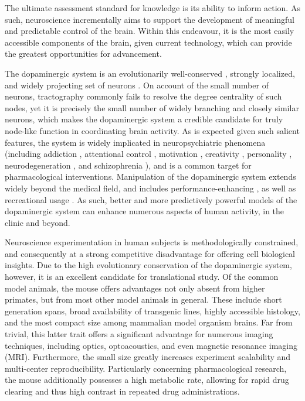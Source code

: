 The ultimate assessment standard for knowledge is its ability to inform action.
As such, neuroscience incrementally aims to support the development of meaningful and predictable control of the brain.
Within this endeavour, it is the most easily accessible components of the brain, given current technology, which can provide the greatest opportunities for advancement.

The dopaminergic system is an evolutionarily well-conserved \cite{Yamamoto2011}, strongly localized, and widely projecting set of neurons \cite{Aransay2015,Fields2007,Ikemoto2007,Hnasko2012}.
On account of the small number of neurons, tractography commonly fails to resolve the degree centrality of such nodes, yet it is precisely the small number of widely branching and closely similar neurons, which makes the dopaminergic system a credible candidate for truly node-like function in coordinating brain activity.
As is expected given such salient features, the system is widely implicated in neuropsychiatric phenomena (including
addiction \cite{DiChiara1988,DiChiara1999},
attentional control \cite{Nieoullon2002},
motivation \cite{Salamone1994},
creativity \cite{Chermahini2010},
personality \cite{Depue1999},
neurodegeneration \cite{Masliah2000},
and schizophrenia \cite{Howes2009}),
and is a common target for pharmacological interventions.
Manipulation of the dopaminergic system extends widely beyond the medical field, and includes performance-enhancing \cite{Mehta2000,Turner2003}, as well as recreational usage \cite{DiChiara1988}.
As such, better and more predictively powerful models of the dopaminergic system can enhance numerous aspects of human activity, in the clinic and beyond.

Neuroscience experimentation in human subjects is methodologically constrained, and consequently at a strong competitive disadvantage for offering cell biological insights.
Due to the high evolutionary conservation of the dopaminergic system, however, it is an excellent candidate for translational study.
Of the common model animals, the mouse offers advantages not only absent from higher primates, but from most other model animals in general.
These include short generation spans, broad availability of transgenic lines, highly accessible histology, and the most compact size among mammalian model organism brains.
Far from trivial, this latter trait offers a significant advantage for numerous imaging techniques, including optics, optoacoustics, and even magnetic resonance imaging (MRI).
Furthermore, the small size greatly increases experiment scalability and multi-center reproducibility.
Particularly concerning pharmacological research, the mouse additionally possesses a high metabolic rate, allowing for rapid drug clearing and thus high contrast in repeated drug administrations.

